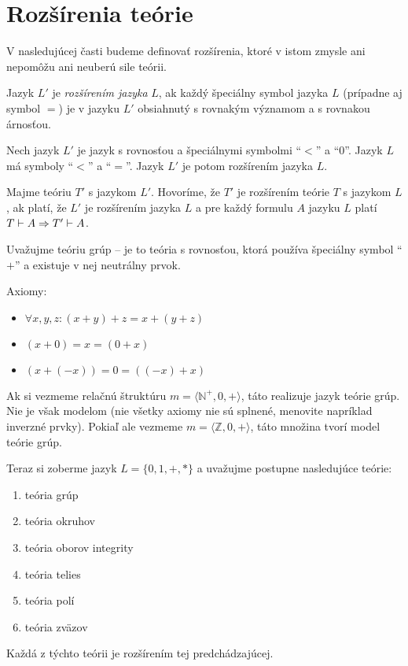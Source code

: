 \section{Rozšírenia teórie}

V nasledujúcej časti budeme definovať rozšírenia,
ktoré v istom zmysle ani nepomôžu ani
neuberú sile teórii.

\begin{definicia}
    Jazyk $L'$ je \emph{rozšírením jazyka} $L$, ak každý
    špeciálny symbol jazyka $L$ (prípadne aj symbol $=$)
    je v jazyku $L'$ obsiahnutý s rovnakým významom a s rovnakou árnosťou.
\end{definicia}

\begin{priklad}
    Nech jazyk $L'$ je jazyk s rovnosťou a špeciálnymi symbolmi
    ``$<$'' a ``$0$''.
    Jazyk $L$ má symboly ``$<$'' a ``$=$''.
    Jazyk $L'$ je potom rozšírením jazyka $L$.
\end{priklad}    

\begin{definicia}
    Majme teóriu $T'$ s jazykom $L'$. Hovoríme, že $T'$ je
    rozšírením teórie $T$ s jazykom $L$, ak platí,
    že $L'$ je rozšírením jazyka $L$ a pre každý formulu $A$ jazyku $L$
    platí $T \vdash A \Rightarrow T' \vdash A$. 
\end{definicia}

\begin{priklad}
    Uvažujme teóriu grúp -- je to teória s rovnosťou, ktorá
    používa špeciálny symbol ``$+$'' a existuje v nej neutrálny prvok.
    
    Axiomy:
    \begin{itemize}
    \item $\forall x,y,z: (x+y)+z = x+(y+z)$
    \item $(x+0) = x = (0+x)$
    \item $(x+(-x)) = 0 = ((-x)+x)$
    \end{itemize}

    Ak si vezmeme relačnú štruktúru $m=\langle \mathbb{N}^+,0,+ \rangle$,
    táto realizuje jazyk teórie grúp.
    Nie je však modelom (nie všetky axiomy nie sú splnené, menovite
    napríklad inverzné prvky).
    Pokiaľ ale vezmeme $m=\langle \mathbb{Z},0,+ \rangle$,
    táto množina tvorí model teórie grúp.  

    Teraz si zoberme jazyk $L = \{0,1,+,*\}$
    a uvažujme postupne nasledujúce teórie:
    \begin{enumerate}
    \item teória grúp
    \item teória okruhov
    \item teória oborov integrity
    \item teória telies
    \item teória polí
    \item teória zväzov
    \end{enumerate}
    Každá z týchto teórii je rozšírením tej predchádzajúcej.
\end{priklad}

